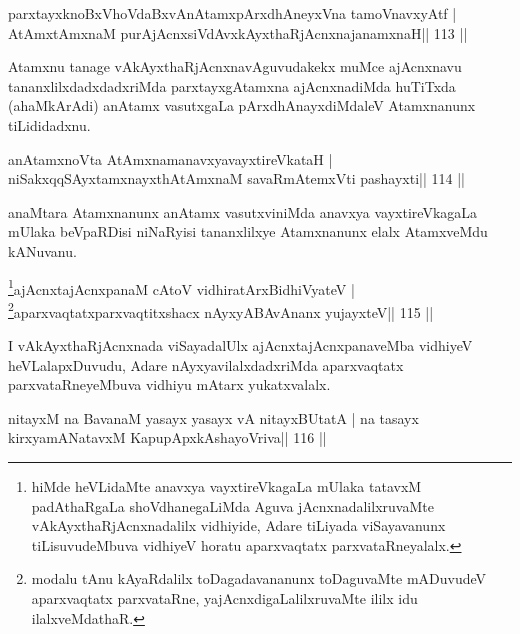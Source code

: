 


\begin{shl}
parxtayxknoBxVhoVdaBxvAnAtamxpArxdhAneyxVna tamoVnavxyAtf |
AtAmx\s\s tAmxnaM purA\s jAcnxsiVdAvxkAyxthaRjAcnxnajanamxnaH\hfill || 113 ||
\end{shl}

\begin{artha}
Atamxnu tanage vAkAyxthaRjAcnxnavAguvudakekx muMce ajAcnxnavu tananxlilxdadxdadxriMda parxtayxgAtamxna ajAcnxnadiMda huTiTxda (ahaMkArAdi) anAtamx vasutxgaLa pArxdhAnayxdiMdaleV Atamxnanunx tiLididadxnu.
\end{artha}

\begin{shl}
anAtamxnoV\s ta AtAmxnamanavxyavayxtireVkataH |
niSakxqqSAyx\s\s tamxnayxthA\s\s tAmxnaM savaRmAtemxVti pashayxti\hfill || 114 ||
\end{shl}

\begin{artha}
anaMtara Atamxnanunx anAtamx vasutxviniMda anavxya vayxtireVkagaLa mUlaka beVpaRDisi niNaRyisi tananxlilxye Atamxnanunx elalx AtamxveMdu kANuvanu.
\end{artha}

\begin{shl}
\footnote{hiMde heVLidaMte anavxya vayxtireVkagaLa mUlaka tatavxM padAthaRgaLa shoVdhanegaLiMda Aguva jAcnxnadalilxruvaMte vAkAyxthaRjAcnxnadalilx vidhiyide, Adare tiLiyada viSayavanunx tiLisuvudeMbuva vidhiyeV horatu aparxvaqtatx parxvataRneyalalx.}ajAcnxtajAcnxpanaM cAtoV vidhiratArxBidhiVyateV |
\footnote{modalu tAnu kAyaRdalilx toDagadavananunx toDaguvaMte mADuvudeV aparxvaqtatx parxvataRne, yajAcnxdigaLalilxruvaMte ililx idu ilalxveMdathaR.}aparxvaqtatxparxvaqtitxshacx nAyxyABAvAnanx yujayxteV\hfill || 115 ||
\end{shl}

\begin{artha}
I vAkAyxthaRjAcnxnada viSayadalUlx ajAcnxtajAcnxpanaveMba vidhiyeV heVLalapxDuvudu, Adare nAyxyavilalxdadxriMda aparxvaqtatx parxvataRneyeMbuva vidhiyu mAtarx yukatxvalalx.
\end{artha}


\begin{shl}
nitayxM na BavanaM yasayx yasayx vA nitayxBUtatA |
na tasayx kirxyamANatavxM KapupApxkAshayoVriva\hfill || 116 ||
\end{shl}

